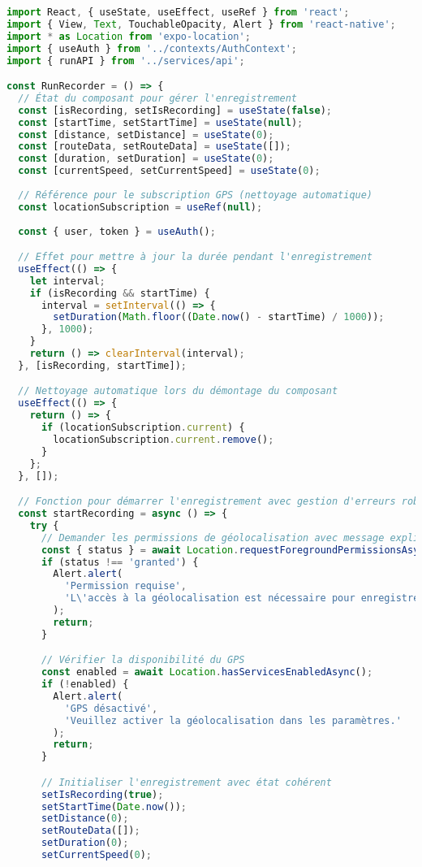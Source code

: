 \begin{lstlisting}[language=javascript, caption=Composant d'enregistrement de course]
import React, { useState, useEffect, useRef } from 'react';
import { View, Text, TouchableOpacity, Alert } from 'react-native';
import * as Location from 'expo-location';
import { useAuth } from '../contexts/AuthContext';
import { runAPI } from '../services/api';

const RunRecorder = () => {
  // État du composant pour gérer l'enregistrement
  const [isRecording, setIsRecording] = useState(false);
  const [startTime, setStartTime] = useState(null);
  const [distance, setDistance] = useState(0);
  const [routeData, setRouteData] = useState([]);
  const [duration, setDuration] = useState(0);
  const [currentSpeed, setCurrentSpeed] = useState(0);
  
  // Référence pour le subscription GPS (nettoyage automatique)
  const locationSubscription = useRef(null);
  
  const { user, token } = useAuth();

  // Effet pour mettre à jour la durée pendant l'enregistrement
  useEffect(() => {
    let interval;
    if (isRecording && startTime) {
      interval = setInterval(() => {
        setDuration(Math.floor((Date.now() - startTime) / 1000));
      }, 1000);
    }
    return () => clearInterval(interval);
  }, [isRecording, startTime]);

  // Nettoyage automatique lors du démontage du composant
  useEffect(() => {
    return () => {
      if (locationSubscription.current) {
        locationSubscription.current.remove();
      }
    };
  }, []);

  // Fonction pour démarrer l'enregistrement avec gestion d'erreurs robuste
  const startRecording = async () => {
    try {
      // Demander les permissions de géolocalisation avec message explicite
      const { status } = await Location.requestForegroundPermissionsAsync();
      if (status !== 'granted') {
        Alert.alert(
          'Permission requise', 
          'L\'accès à la géolocalisation est nécessaire pour enregistrer vos courses.'
        );
        return;
      }

      // Vérifier la disponibilité du GPS
      const enabled = await Location.hasServicesEnabledAsync();
      if (!enabled) {
        Alert.alert(
          'GPS désactivé', 
          'Veuillez activer la géolocalisation dans les paramètres.'
        );
        return;
      }

      // Initialiser l'enregistrement avec état cohérent
      setIsRecording(true);
      setStartTime(Date.now());
      setDistance(0);
      setRouteData([]);
      setDuration(0);
      setCurrentSpeed(0);


\end{lstlisting}
